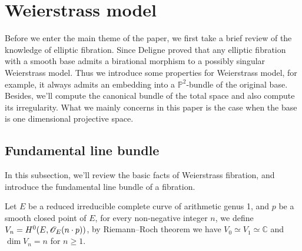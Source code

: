 
\section{Weierstrass model}
Before we enter the main theme of the paper, we first take a brief review of the knowledge of elliptic fibration. Since Deligne proved \cite{deligne1975courbes} that any elliptic fibration with a smooth base admits a birational morphism to a possibly singular Weierstrass model. Thus we introduce some properties for Weierstrass model, for example, it always admits an embedding into a $\mathbb{P}^2$-bundle of the original base. Besides, we'll compute the canonical bundle of the total space and also compute its irregularity. What we mainly concerns in this paper is the case when the base is one dimensional projective space.
\subsection{Fundamental line bundle}
In this subsection, we'll review the basic facts of Weierstrass fibration, and introduce the fundamental line bundle of a fibration.\\ \indent
\begin{definition}
Let $E$ be a reduced irreducible complete curve of arithmetic genus 1, and $p$ be a smooth closed point of $E$, for every non-negative integer $n$, we define $V_n=H^0(E,\mathscr{O}_E(n\cdot p))$, by Riemann--Roch theorem we have $V_0\simeq V_1\simeq \mathbb{C}$ and $\dim V_n=n$ for $n\geq 1$.
\end{definition}

